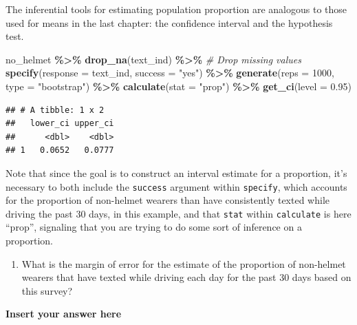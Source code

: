 \documentclass[
]{article}
\newenvironment{Shaded}{\begin{snugshade}}{\end{snugshade}}
\newcommand{\AttributeTok}[1]{\textcolor[rgb]{0.13,0.29,0.53}{#1}}
\newcommand{\CommentTok}[1]{\textcolor[rgb]{0.56,0.35,0.01}{\textit{#1}}}
\newcommand{\DecValTok}[1]{\textcolor[rgb]{0.00,0.00,0.81}{#1}}
\newcommand{\FloatTok}[1]{\textcolor[rgb]{0.00,0.00,0.81}{#1}}
\newcommand{\FunctionTok}[1]{\textcolor[rgb]{0.13,0.29,0.53}{\textbf{#1}}}
\newcommand{\NormalTok}[1]{#1}
\newcommand{\SpecialCharTok}[1]{\textcolor[rgb]{0.81,0.36,0.00}{\textbf{#1}}}
\newcommand{\StringTok}[1]{\textcolor[rgb]{0.31,0.60,0.02}{#1}}
\providecommand{\tightlist}{%
  \setlength{\itemsep}{0pt}\setlength{\parskip}{0pt}}
\begin{document}
The inferential tools for estimating population proportion are analogous
to those used for means in the last chapter: the confidence interval and
the hypothesis test.

\begin{Shaded}
\begin{Highlighting}[]
\NormalTok{no\_helmet }\SpecialCharTok{\%\textgreater{}\%}
  \FunctionTok{drop\_na}\NormalTok{(text\_ind) }\SpecialCharTok{\%\textgreater{}\%} \CommentTok{\# Drop missing values}
  \FunctionTok{specify}\NormalTok{(}\AttributeTok{response =}\NormalTok{ text\_ind, }\AttributeTok{success =} \StringTok{"yes"}\NormalTok{) }\SpecialCharTok{\%\textgreater{}\%}
  \FunctionTok{generate}\NormalTok{(}\AttributeTok{reps =} \DecValTok{1000}\NormalTok{, }\AttributeTok{type =} \StringTok{"bootstrap"}\NormalTok{) }\SpecialCharTok{\%\textgreater{}\%}
  \FunctionTok{calculate}\NormalTok{(}\AttributeTok{stat =} \StringTok{"prop"}\NormalTok{) }\SpecialCharTok{\%\textgreater{}\%}
  \FunctionTok{get\_ci}\NormalTok{(}\AttributeTok{level =} \FloatTok{0.95}\NormalTok{)}
\end{Highlighting}
\end{Shaded}

\begin{verbatim}
## # A tibble: 1 x 2
##   lower_ci upper_ci
##      <dbl>    <dbl>
## 1   0.0652   0.0777
\end{verbatim}

Note that since the goal is to construct an interval estimate for a
proportion, it's necessary to both include the \texttt{success} argument
within \texttt{specify}, which accounts for the proportion of non-helmet
wearers than have consistently texted while driving the past 30 days, in
this example, and that \texttt{stat} within \texttt{calculate} is here
``prop'', signaling that you are trying to do some sort of inference on
a proportion.

\begin{enumerate}
\def\labelenumi{\arabic{enumi}.}
\setcounter{enumi}{2}
\tightlist
\item
  What is the margin of error for the estimate of the proportion of
  non-helmet wearers that have texted while driving each day for the
  past 30 days based on this survey?
\end{enumerate}

\textbf{Insert your answer here}
\end{document}
